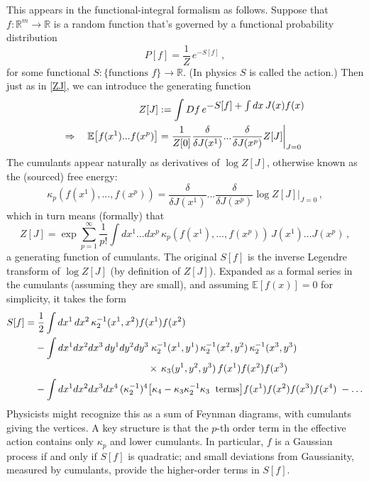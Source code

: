 \documentclass[11pt]{article}
\newcommand{\R}{\mathbb{R}}
\newcommand{\E}{\mathbb{E}}
\begin{document}
This appears in the functional-integral formalism as follows. Suppose that $f:\R^m\to \R$ is a random function that's governed by a functional probability distribution
%
\begin{equation} P[f] = \frac{1}{Z}\,e^{\textstyle-S[f]}\,, \end{equation}
%
for some functional $S:\{\text{functions } f\}\to \R$. (In physics $S$ is called the action.) Then just as in \eqref{ZJ}, we can introduce the generating function
%
\begin{align} Z[J] &:= \int Df\, e^{\textstyle-S[f]+\int dx\, J(x)f(x)} \notag \\ \Rightarrow\quad \E\big[f(x^1)...f(x^p)\big] &= \frac{1}{Z[0]}\frac{\delta}{\delta J(x^1)}...\frac{\delta}{\delta J(x^p)} Z[J]\bigg|_{J=0} \end{align}
%
The cumulants appear naturally as derivatives of $\log Z[J]$, otherwise known as the (sourced) free energy:
%
\begin{equation} \kappa_p(f(x^1),...,f(x^p)) = \frac{\delta}{\delta J(x^1)}...\frac{\delta}{\delta J(x^p)} \log Z[J] \bigg|_{J=0}\,, \end{equation}
%
which in turn means (formally) that
%
\begin{equation} Z[J] = \exp\sum_{p=1}^\infty \frac{1}{p!}\int dx^1...dx^p\, \kappa_p(f(x^1),...,f(x^p))\,J(x^1)...J(x^p)\,, \end{equation}
%
a generating function of cumulants. The original $S[f]$ is the inverse Legendre transform of $\log Z[J]$ (by definition of $Z[J]$). Expanded as a formal series in the cumulants (assuming they are small), and assuming $\E[f(x)]=0$ for simplicity, it takes the form
%
\begin{align} S[f] = &\; \frac{1}{2} \int dx^1\, dx^2\, \kappa_2^{-1}(x^1,x^2) f(x^1)f(x^2) \notag \\
 & - \int dx^1 dx^2 dx^3\, dy^1 dy^2 dy^3\; \kappa_2^{-1}(x^1,y^1)\,\kappa_2^{-1}(x^2,y^2)\,\kappa_2^{-1}(x^3,y^3) \notag \\
 & \hspace{1.6in} \times\, \kappa_3(y^1,y^2,y^3)\,f(x^1)f(x^2)f(x^3) \notag \\
 &- \int dx^1 dx^2 dx^3 dx^4\, (\kappa_2^{-1})^4\big[ \kappa_4 - \kappa_3\kappa_2^{-1} \kappa_3\;\;\text{terms}\big] f(x^1)f(x^2)f(x^3)f(x^4)\; - \ldots\end{align}
%
Physicists might recognize this as a sum of Feynman diagrams, with cumulants giving the vertices.
A key structure is that the $p$-th order term in the effective action contains only $\kappa_p$ and lower cumulants. In particular, $f$ is a Gaussian process if and only if $S[f]$ is quadratic; and small deviations from Gaussianity, measured by cumulants, provide the higher-order terms in $S[f]$.
\end{document}
